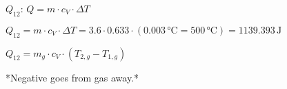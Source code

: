 \( Q_{12} \): \( Q = m \cdot c_{V} \cdot \Delta T \)  

\( Q_{12} = m \cdot c_{V} \cdot \Delta T = 3.6 \cdot 0.633 \cdot (0.003 \, \text{°C} = 500 \, \text{°C}) = 1139.393 \, \text{J} \)  

\( Q_{12} = m_{g} \cdot c_{V} \cdot (T_{2,g} - T_{1,g}) \)  

*Negative goes from gas away.*
